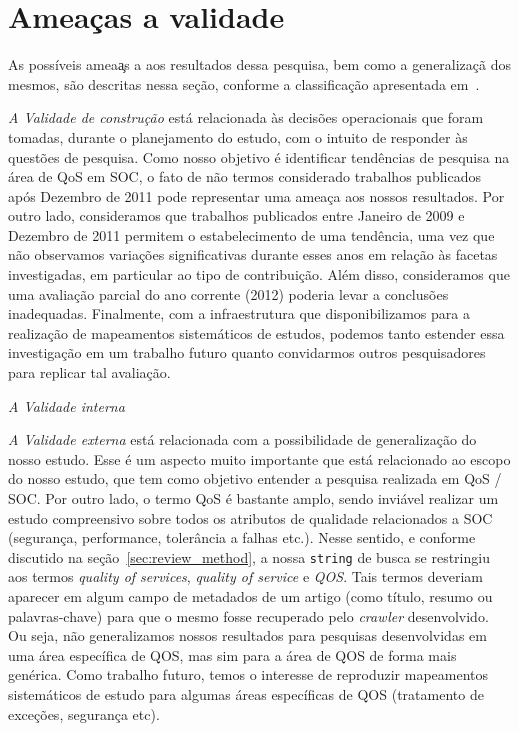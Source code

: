 \section{Amea\c cas a validade}

As poss\'{i}veis amea\c as a aos 
resultados dessa pesquisa, bem como a generaliza\c c\~{a} dos mesmos, 
s\~{a}o descritas nessa se\c c\~{a}o, conforme a 
classifica\c c\~{a}o apresentada em~\cite{leedy1980practical}. 

\noindent
\emph{A Validade de constru\c c\~{a}o} est\'{a} relacionada
\`{a}s decis\~{o}es operacionais que foram tomadas, durante o
planejamento do estudo, com o intuito de responder \`{a}s quest\~{o}es de
pesquisa. Como nosso objetivo \'{e} identificar
tend\^{e}ncias de pesquisa na \'{a}rea de QoS em SOC, o fato de
n\~{a}o termos considerado trabalhos publicados ap\'{o}s Dezembro de
2011 pode representar uma amea\c ca aos nossos resultados. Por outro
lado, consideramos que trabalhos publicados entre Janeiro de 2009 e
Dezembro de 2011 permitem o estabelecimento de uma tend\^{e}ncia,
uma vez que n\~{a}o observamos varia\c c\~{o}es significativas durante
esses anos em rela\c c\~{a}o \`{a}s facetas investigadas, em particular ao tipo de
contribui\c c\~{a}o. Al\'{e}m disso, consideramos que uma avalia\c c\~{a}o parcial 
do ano corrente (2012) poderia levar a conclus\~{o}es
inadequadas. Finalmente, com a infraestrutura que disponibilizamos para a realiza\c
c\~{a}o de mapeamentos sistem\'{a}ticos de estudos, podemos tanto estender 
essa investiga\c c\~{a}o em um trabalho futuro quanto convidarmos outros 
pesquisadores para replicar tal avalia\c c\~{a}o. 

\noindent
\emph{A Validade interna}

\noindent
\emph{A Validade externa} est\'{a} relacionada com a possibilidade de
generaliza\c c\~{a}o do nosso estudo. Esse \'{e} um aspecto muito
importante que est\'{a} relacionado ao escopo do nosso estudo, que tem
como objetivo entender a pesquisa realizada em QoS / SOC. Por outro
lado, o termo QoS \'{e} bastante amplo, sendo invi\'{a}vel realizar
um estudo compreensivo sobre todos os atributos de qualidade
relacionados a SOC (seguran\c ca, performance, toler\^{a}ncia a falhas
etc.). Nesse sentido, e conforme discutido na se\c c\~{a}o~\ref{sec:review_method}, a
nossa \texttt{string} de busca se restringiu aos termos \emph{quality
  of services}, \emph{quality of service} e \emph{QOS}. Tais termos
deveriam aparecer em algum campo de metadados de um artigo (como
t\'{i}tulo, resumo ou palavras-chave) para que o mesmo fosse recuperado pelo
\emph{crawler} desenvolvido. Ou seja, n\~{a}o generalizamos nossos
resultados para pesquisas desenvolvidas em uma \'{a}rea espec\'{i}fica de
QOS, mas sim para a \'{a}rea de QOS de forma mais gen\'{e}rica. Como
trabalho futuro, temos
o interesse de reproduzir mapeamentos sistem\'{a}ticos de estudo para
algumas \'{a}reas espec\'{i}ficas de QOS (tratamento de exce\c
c\~{o}es, seguran\c ca etc). 

